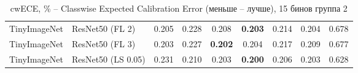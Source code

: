 \begin{table}[h!]
{\begin{tabular}{llccccccc}
TinyImageNet &             ResNet50 (FL 2) &         0.205 &                  0.228 &                  0.208 & \textbf{0.203} &                  0.214 &                  0.204 &                  0.678 \\
TinyImageNet &             ResNet50 (FL 3) &         0.203 &                  0.227 & \textbf{0.202} &                  0.204 &                  0.217 &                  0.209 &                  0.677 \\
TinyImageNet &          ResNet50 (LS 0.05) &         0.231 &                  0.210 &                  0.203 & \textbf{0.200} &                  0.206 &                  0.203 &                  0.628 \\
\bottomrule
\end{tabular}%
}
\caption{cwECE, \% -- Classwise Expected Calibration Error (меньше -- лучше), 15 бинов группа 2}
\label{tab:metrics:cwECE_2}
\end{table}

